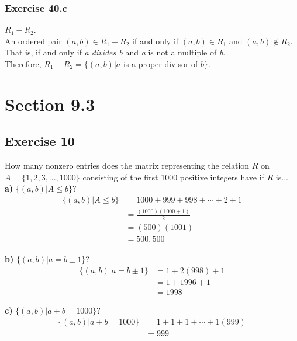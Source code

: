 \documentclass[12pt]{article}
\begin{document}
    \subsubsection{Exercise 40.c}
    $R_1 - R_2$.\\
    An ordered pair $(a,b)\in R_1-R_2$ if and only if $(a,b)\in R_1$ and $(a,b)\notin R_2$.\\
    That is, if and only if \textit{a divides b} and \textit{a} is not a multiple of \textit{b}.\\
    Therefore,
    $R_1-R_2 = \{(a,b) | a$ is a proper divisor of $b \}$.

    \section{Section 9.3}
    \subsection{Exercise 10}
    How many nonzero entries does the matrix representing the relation $R$ on $A=\{1,2,3,...,1000\}$ consisting of the first 1000 positive integers have if $R$ is...\\
    \textbf{a)} $\{(a,b) | A \leq b \}$?
    \begin{equation}
        \begin{split}
            \{(a,b) | A \leq b \}&=1000+999+998+\cdots + 2 + 1\\
            &=\frac{(1000)(1000+1)}{2}\\
            &=(500)(1001)\\
            &=500,500
        \end{split}
    \end{equation}
    
    \textbf{b)} $\{(a,b) | a=b \pm 1 \}$?
    \begin{equation}
        \begin{split}
            \{(a,b) | a=b \pm 1 \}&=1+2(998)+1\\
            &=1+1996+1\\
            &=1998
        \end{split}
    \end{equation}
    
    \textbf{c)} $\{(a,b) | a+b = 1000 \}$?
    \begin{equation}
        \begin{split}
            \{(a,b) | a+b = 1000 \}&=1+1+1+\cdots + 1(999)\\
            &=999
        \end{split}
    \end{equation}
    
\end{document}
